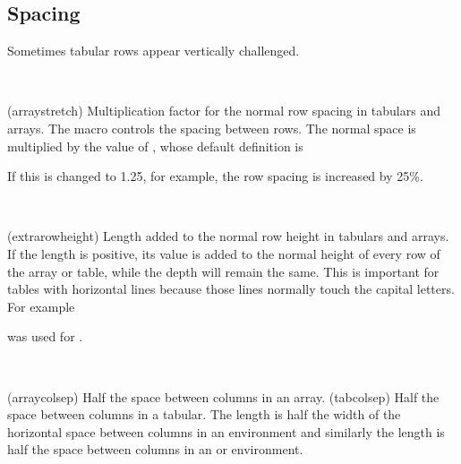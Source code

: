 {{{{{{\subsection{Spacing}

    Sometimes tabular rows appear vertically challenged.

\begin{syntax}
\cmd{\arraystretch} \\
\end{syntax}
\glossary(arraystretch)%
  {}%
  {Multiplication factor for the normal row spacing in tabulars and arrays.}
The macro \cmd{\arraystretch} controls the spacing between 
rows. The normal
space is multiplied by the value of \cmd{\arraystretch}, whose default
definition is
\begin{lcode}
\newcommand{\arraystretch}{1.0}
\end{lcode}
If this is changed to 1.25, for example, the row spacing is increased by 25\%.

\begin{syntax}
\lnc{\extrarowheight} \\
\end{syntax}
\glossary(extrarowheight)%
  {}%
  {Length added to the normal row height in tabulars and arrays.}
If the length \lnc{\extrarowheight} is positive, its value is added
to the normal height of every row of the array or table, while
the depth will remain the same. This is important for tables
with horizontal lines because those lines normally touch the
capital letters. For example
was used for .

\begin{syntax}
\lnc{\arraycolsep} \lnc{\tabcolsep} \\
\end{syntax}
\glossary(arraycolsep)%
  {}%
  {Half the space between columns in an array.}
\glossary(tabcolsep)%
  {}%
  {Half the space between columns in a tabular.}
The length \lnc{\arraycolsep} is half the width of the horizontal space
between columns in an  environment 
and similarly the length
\lnc{\tabcolsep} is half the space between 
columns in an 
or  environment.

}}}}}}
